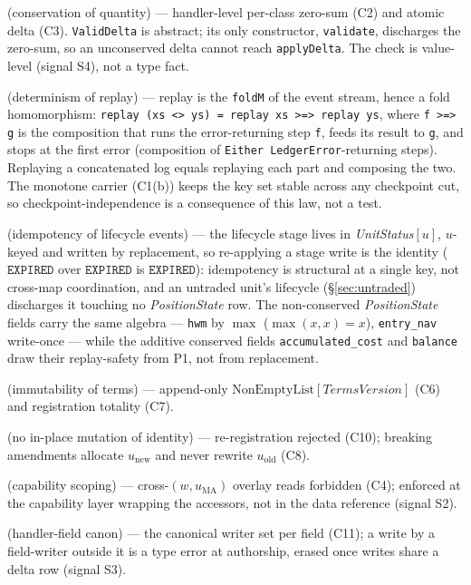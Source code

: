 \documentclass[11pt,a4paper]{article}
\begin{document}
\begin{description}[leftmargin=3em,labelwidth=2em,labelsep=0.5em,style=nextline]
\item[\textbf{P1}] (conservation of quantity) --- handler-level per-class zero-sum (C2) and
atomic delta (C3). \texttt{ValidDelta} is abstract; its only constructor, \texttt{validate},
discharges the zero-sum, so an unconserved delta cannot reach \texttt{applyDelta}. The check
is value-level (signal S4), not a type fact.
\item[\textbf{P3}] (determinism of replay) --- replay is the \texttt{foldM} of the event
stream, hence a fold homomorphism: \texttt{replay (xs <> ys) = replay xs >=> replay ys},
where \texttt{f >=> g} is the composition that runs the error-returning step \texttt{f},
feeds its result to \texttt{g}, and stops at the first error (composition of
\texttt{Either LedgerError}-returning steps). Replaying a concatenated log equals replaying
each part and composing the two. The monotone carrier (C1(b)) keeps the key set stable
across any checkpoint cut, so checkpoint-independence is a consequence of this law, not a
test.
\item[\textbf{P5}] (idempotency of lifecycle events) --- the lifecycle stage lives in
\emph{UnitStatus}$[u]$, $u$-keyed and written by replacement, so re-applying a stage write is
the identity ($\texttt{EXPIRED}$ over $\texttt{EXPIRED}$ is $\texttt{EXPIRED}$): idempotency is
structural at a single key, not cross-map coordination, and an untraded unit's lifecycle
(\S\ref{sec:untraded}) discharges it touching no \emph{PositionState} row. The non-conserved
\emph{PositionState} fields carry the same algebra --- \texttt{hwm} by $\max$
($\max(x,x)=x$), \texttt{entry\_nav} write-once --- while the additive conserved fields
\texttt{accumulated\_cost} and \texttt{balance} draw their replay-safety from P1, not from
replacement.
\item[\textbf{P6}] (immutability of terms) --- append-only
$\mathrm{NonEmptyList}[\mathit{TermsVersion}]$ (C6) and registration totality (C7).
\item[\textbf{P7}] (no in-place mutation of identity) --- re-registration rejected (C10);
breaking amendments allocate $u_{\mathrm{new}}$ and never rewrite $u_{\mathrm{old}}$ (C8).
\item[\textbf{P9}] (capability scoping) --- cross-$(w,u_{\mathrm{MA}})$ overlay reads
forbidden (C4); enforced at the capability layer wrapping the accessors, not in the data
reference (signal S2).
\item[\textbf{P10}] (handler-field canon) --- the canonical writer set per field (C11); a
write by a field-writer outside it is a type error at authorship, erased once writes share a
delta row (signal S3).
\end{description}
\end{document}

